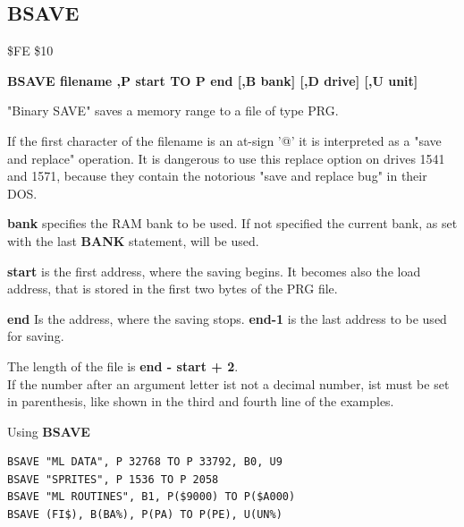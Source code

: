 
\newpage
\subsection{BSAVE}
\begin{description}[leftmargin=2cm,style=nextline]
\item [Token:] \$FE \$10
\item [Format:] {\bf BSAVE filename ,P start TO P end
                [,B bank] [,D drive] [,U unit] }
\item [Usage:]
   "Binary SAVE" saves a memory range to
   a file of type PRG.

   \filenamedefinition
   If the first character of the filename is an at-sign '@' it
   is interpreted as a "save and replace" operation. It is dangerous
   to use this replace option on drives 1541 and 1571, because they
   contain the notorious "save and replace bug" in their DOS.

   {\bf bank} specifies the RAM bank to be used.
   If not specified the current bank, as set with the last
   {\bf BANK} statement, will be used.

   {\bf start} is the first address, where the saving begins.
   It becomes also the load address,
   that is stored in the first two bytes of the PRG file.

   {\bf end} Is the address, where the saving stops.
   {\bf end-1} is the last address to be used for saving.

   \drivedefinition

   \unitdefinition

\item [Remarks:]
   The length of the file is {\bf end - start + 2}. \\
   If the number after an argument letter ist not a decimal
   number, ist must be set in parenthesis, like shown
   in the third and fourth line of the examples.


\item [Example:] Using {\bf BSAVE}
\begin{tcolorbox}[colback=black,coltext=white]
\verbatimfont{\codefont}
\begin{verbatim}
BSAVE "ML DATA", P 32768 TO P 33792, B0, U9
BSAVE "SPRITES", P 1536 TO P 2058
BSAVE "ML ROUTINES", B1, P($9000) TO P($A000)
BSAVE (FI$), B(BA%), P(PA) TO P(PE), U(UN%)
\end{verbatim}
\end{tcolorbox}
\end{description}

